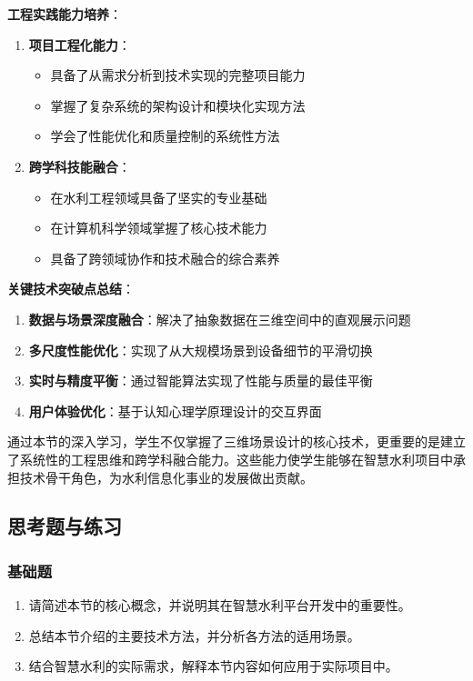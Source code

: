 \textbf{工程实践能力培养}： \begin{enumerate} \def\labelenumi{\arabic{enumi}.} \tightlist \item \textbf{项目工程化能力}： \begin{itemize}
\tightlist \item 具备了从需求分析到技术实现的完整项目能力 \item 掌握了复杂系统的架构设计和模块化实现方法 \item 学会了性能优化和质量控制的系统性方法 \end{itemize} \item
\textbf{跨学科技能融合}： \begin{itemize} \tightlist \item 在水利工程领域具备了坚实的专业基础 \item 在计算机科学领域掌握了核心技术能力 \item 具备了跨领域协作和技术融合的综合素养
\end{itemize} \end{enumerate} \textbf{关键技术突破点总结}： \begin{enumerate} \def\labelenumi{\arabic{enumi}.} \tightlist \item
\textbf{数据与场景深度融合}：解决了抽象数据在三维空间中的直观展示问题 \item \textbf{多尺度性能优化}：实现了从大规模场景到设备细节的平滑切换 \item
\textbf{实时与精度平衡}：通过智能算法实现了性能与质量的最佳平衡 \item \textbf{用户体验优化}：基于认知心理学原理设计的交互界面 \end{enumerate}
通过本节的深入学习，学生不仅掌握了三维场景设计的核心技术，更重要的是建立了系统性的工程思维和跨学科融合能力。这些能力使学生能够在智慧水利项目中承担技术骨干角色，为水利信息化事业的发展做出贡献。
\subsection{思考题与练习}\label{ux601dux8003ux9898ux4e0eux7ec3ux4e60} \subsubsection{基础题}\label{ux57faux7840ux9898}
\begin{enumerate} \def\labelenumi{\arabic{enumi}.} \tightlist \item 请简述本节的核心概念，并说明其在智慧水利平台开发中的重要性。 \item
总结本节介绍的主要技术方法，并分析各方法的适用场景。 \item 结合智慧水利的实际需求，解释本节内容如何应用于实际项目中。 \end{enumerate}
